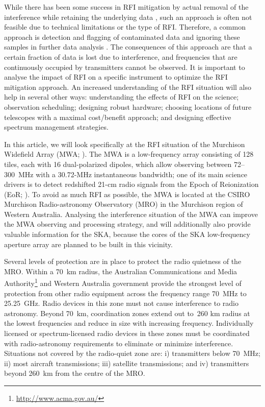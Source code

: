 \documentclass{pasa}
\begin{document}
While there has been some success in RFI mitigation by actual removal of the interference while retaining the underlying data \citep{spatial-filtering-parkes-multibeam-for-pulses,rfi-spatial-processing-hellbourg-2014}, such an approach is often not feasible due to technical limitations or the type of RFI. Therefore, a common approach is detection and flagging of contaminated data and ignoring these samples in further data analysis \citep{statistical-rfi-removal,pieflag-middelberg-2006,post-correlation-rfi-classification,prasad-flagcal-2012,serpent-peck-2013}. The consequences of this approach are that a certain fraction of data is lost due to interference, and frequencies that are continuously occupied by transmitters cannot be observed. It is important to analyse the impact of RFI on a specific instrument to optimize the RFI mitigation approach. An increased understanding of the RFI situation will also help in several other ways: understanding the effects of RFI on the science; observation scheduling; designing robust hardware; choosing locations of future telescopes with a maximal cost/benefit approach; and designing effective spectrum management strategies.

In this article, we will look specifically at the RFI situation of the Murchison Widefield Array (MWA; \citealt{mwa-design-2009,mwa}). The MWA is a low-frequency array consisting of 128 tiles, each with 16 dual-polarized dipoles, which allow observing between 72--300~MHz with a 30.72-MHz instantaneous bandwidth; one of its main science drivers is to detect redshifted 21-cm radio signals from the Epoch of Reionization (EoR; \citealt{bowman-science-with-the-mwa-2013}). To avoid as much RFI as possible, the MWA is located at the CSIRO Murchison Radio-astronomy Observatory (MRO) in the Murchison region of Western Australia. Analysing the interference situation of the MWA can improve the MWA observing and processing strategy, and will additionally also provide valuable information for the SKA, because the cores of the SKA low-frequency aperture array are planned to be built in this vicinity.

Several levels of protection are in place to protect the radio quietness of the MRO. Within a 70~km radius, the Australian Communications and Media Authority\footnote{\url{http://www.acma.gov.au/}} and Western Australia government provide the strongest level of protection from other radio equipment across the frequency range 70~MHz to 25.25~GHz. Radio devices in this zone must not cause interference to radio astronomy.  Beyond 70~km, coordination zones extend out to~260 km radius at the lowest frequencies and reduce in size with increasing frequency. Individually licensed or spectrum-licensed radio devices in these zones must be coordinated with radio-astronomy requirements to eliminate or minimize interference. Situations not covered by the radio-quiet zone are: i) transmitters below 70~MHz; ii) most aircraft transmissions; iii) satellite transmissions; and iv) transmitters beyond 260~km from the centre of the MRO.
\end{document}
